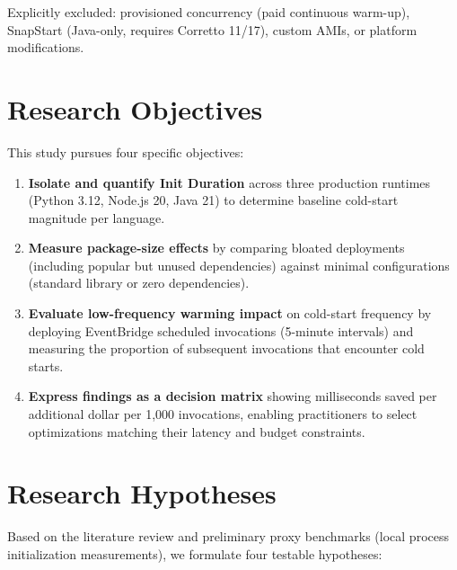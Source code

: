 Explicitly excluded: provisioned concurrency (paid continuous warm-up), SnapStart (Java-only, requires Corretto 11/17), custom AMIs, or platform modifications.

\section{Research Objectives}

This study pursues four specific objectives:

\begin{enumerate}
    \item \textbf{Isolate and quantify Init Duration} across three production runtimes (Python 3.12, Node.js 20, Java 21) to determine baseline cold-start magnitude per language.
    
    \item \textbf{Measure package-size effects} by comparing bloated deployments (including popular but unused dependencies) against minimal configurations (standard library or zero dependencies).
    
    \item \textbf{Evaluate low-frequency warming impact} on cold-start frequency by deploying EventBridge scheduled invocations (5-minute intervals) and measuring the proportion of subsequent invocations that encounter cold starts.
    
    \item \textbf{Express findings as a decision matrix} showing milliseconds saved per additional dollar per 1,000 invocations, enabling practitioners to select optimizations matching their latency and budget constraints.
\end{enumerate}

\section{Research Hypotheses}

Based on the literature review and preliminary proxy benchmarks (local process initialization measurements), we formulate four testable hypotheses:

